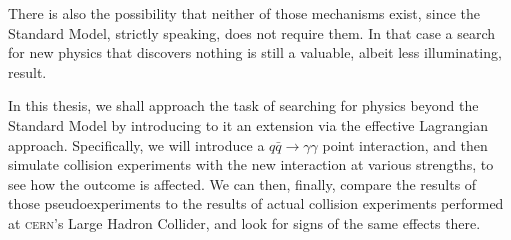 There is also the possibility that neither of those mechanisms exist, since the Standard Model, strictly speaking, does not require them. In that case a search for new physics that discovers nothing is still a valuable, albeit less illuminating, result.

In this thesis, we shall approach the task of searching for physics beyond the Standard Model by introducing to it an extension via the effective Lagrangian approach. Specifically, we will introduce a $q\bar q\rightarrow\gamma\gamma$ point interaction, and then simulate collision experiments with the new interaction at various strengths, to see how the outcome is affected. We can then, finally, compare the results of those pseudoexperiments to the results of actual collision experiments performed at \textsc{cern}'s Large Hadron Collider, and look for signs of the same effects there.